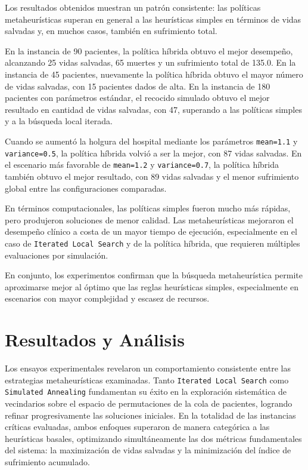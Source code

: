 \documentclass[12pt,a4paper]{article}
\begin{document}
Los resultados obtenidos muestran un patrón consistente: las políticas metaheurísticas superan en general a 
las heurísticas simples en términos de vidas salvadas y, en muchos casos, también en sufrimiento total.

En la instancia de 90 pacientes, la política híbrida obtuvo el mejor desempeño, alcanzando 25 vidas salvadas, 
65 muertes y un sufrimiento total de 135.0. 
En la instancia de 45 pacientes, nuevamente la política híbrida obtuvo el mayor número de vidas salvadas, 
con 15 pacientes dados de alta. En la instancia de 180 pacientes con parámetros estándar, 
el recocido simulado obtuvo el mejor resultado en cantidad de vidas salvadas, con 47, superando a las políticas simples y 
a la búsqueda local iterada.

Cuando se aumentó la holgura del hospital mediante los parámetros \texttt{mean=1.1} y \texttt{variance=0.5}, 
la política híbrida volvió a ser la mejor, con 87 vidas salvadas. 
En el escenario más favorable de \texttt{mean=1.2} y \texttt{variance=0.7}, la política híbrida también obtuvo el mejor resultado, 
con 89 vidas salvadas y el menor sufrimiento global entre las configuraciones comparadas.

En términos computacionales, las políticas simples fueron mucho más rápidas, 
pero produjeron soluciones de menor calidad. 
Las metaheurísticas mejoraron el desempeño clínico a costa de un mayor tiempo de ejecución, 
especialmente en el caso de \texttt{Iterated Local Search} y de la política híbrida, 
que requieren múltiples evaluaciones por simulación.

En conjunto, los experimentos confirman que la búsqueda metaheurística permite aproximarse mejor al óptimo 
que las reglas heurísticas simples, especialmente en escenarios con mayor complejidad y escasez de recursos.

\section{Resultados y Análisis}

Los ensayos experimentales revelaron un comportamiento consistente entre las estrategias metaheurísticas examinadas. 
Tanto \texttt{Iterated Local Search} como \texttt{Simulated Annealing} fundamentan su éxito en la exploración 
sistemática de vecindarios sobre el espacio de permutaciones de la cola de pacientes, 
logrando refinar progresivamente las soluciones iniciales. En la totalidad de las instancias críticas evaluadas, 
ambos enfoques superaron de manera categórica a las heurísticas basales, 
optimizando simultáneamente las dos métricas fundamentales del sistema: la maximización de vidas salvadas y 
la minimización del índice de sufrimiento acumulado.
\end{document}
